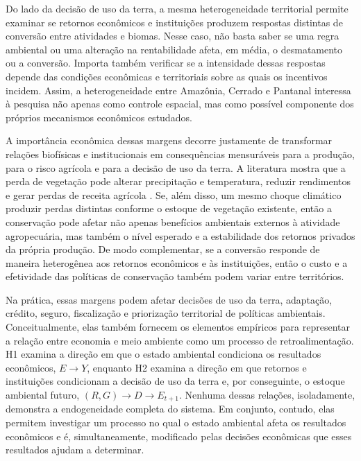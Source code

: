 Do lado da decisão de uso da terra, a mesma heterogeneidade territorial permite examinar se retornos econômicos e instituições produzem respostas distintas de conversão entre atividades e biomas. Nesse caso, não basta saber se uma regra ambiental ou uma alteração na rentabilidade afeta, em média, o desmatamento ou a conversão. Importa também verificar se a intensidade dessas respostas depende das condições econômicas e territoriais sobre as quais os incentivos incidem. Assim, a heterogeneidade entre Amazônia, Cerrado e Pantanal interessa à pesquisa não apenas como controle espacial, mas como possível componente dos próprios mecanismos econômicos estudados.


A importância econômica dessas margens decorre justamente de transformar relações biofísicas e institucionais em consequências mensuráveis para a produção, para o risco agrícola e para a decisão de uso da terra. A literatura mostra que a perda de vegetação pode alterar precipitação e temperatura, reduzir rendimentos e gerar perdas de receita agrícola \cite{spera2020brazilian,leitefilho2021deforestation,batista2023deforestation,leitefilho2025intensification,li2026amazon}. Se, além disso, um mesmo choque climático produzir perdas distintas conforme o estoque de vegetação existente, então a conservação pode afetar não apenas benefícios ambientais externos à atividade agropecuária, mas também o nível esperado e a estabilidade dos retornos privados da própria produção. De modo complementar, se a conversão responde de maneira heterogênea aos retornos econômicos e às instituições, então o custo e a efetividade das políticas de conservação também podem variar entre territórios.

Na prática, essas margens podem afetar decisões de uso da terra, adaptação, crédito, seguro, fiscalização e priorização territorial de políticas ambientais. Conceitualmente, elas também fornecem os elementos empíricos para representar a relação entre economia e meio ambiente como um processo de retroalimentação. H1 examina a direção em que o estado ambiental condiciona os resultados econômicos, $E\rightarrow Y$, enquanto H2 examina a direção em que retornos e instituições condicionam a decisão de uso da terra e, por conseguinte, o estoque ambiental futuro, $(R,G)\rightarrow D\rightarrow E_{t+1}$. Nenhuma dessas relações, isoladamente, demonstra a endogeneidade completa do sistema. Em conjunto, contudo, elas permitem investigar um processo no qual o estado ambiental afeta os resultados econômicos e é, simultaneamente, modificado pelas decisões econômicas que esses resultados ajudam a determinar.

